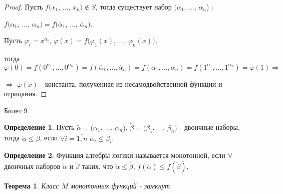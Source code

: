\documentclass[a4paper, 12pt]{article}
\renewcommand{\phi}{\varphi}
\theoremstyle{definition}
\newtheorem*{definition}{Определение}
\theoremstyle{plain}
\newtheorem*{theorem}{Теорема}
\theoremstyle{remark}
\begin{document}
  \begin{proof}
    Пусть $f(x_1$, $\ldots$, $x_n)\notin S$, тогда существует набор $(\alpha_1$, $\ldots$, $\alpha_n$) :\\ 
    \begin{center}
      $f(\alpha_1$, $\ldots$, $\alpha_n)=f(\overline{\alpha}_1$, $\ldots$, $\overline{\alpha}_n)$.\\
    \end{center} 
    Пусть $\phi_i=x^{\alpha_i}$, $\phi(x)=f(\phi_1(x)$, $\ldots$, $\phi_n(x))$,\\ 
    \begin{center}
      тогда $\phi(0)= f(0^{\alpha_1}, \ldots, 0^{\alpha_n})=f(\overline{\alpha}_1, \ldots, \overline{\alpha}_n)=f(\alpha_1, \ldots, \alpha_n)=f(1^{\alpha_1}, \ldots, 1^{\alpha_n})=\phi(1)\Longrightarrow$\\
    \end{center}
      $\Longrightarrow$ $\phi(x)$ - константа, полученная из несамодвойственной функции и отрицания.
  \end{proof}
  \begin{center}
    Билет 9
  \end{center}
  \begin{definition}
    Пусть $\tilde{\alpha}=(\alpha_1$, $\ldots$, $\alpha_n)$, $\tilde{\beta}=(\beta_1$, $\ldots$, $\beta_n)$ - двоичные наборы, тогда $\tilde{\alpha}\leqslant\tilde{\beta}$, если $\forall i=\overline{1,n}$ $\alpha_i\leqslant\beta_i$.
  \end{definition}
  \begin{definition}
    Функция алгебры логики называется монотонной, если $\forall$ двоичных наборов $\tilde{\alpha}$ и $\tilde{\beta}$ таких, что $\tilde{\alpha}\leqslant\tilde{\beta}$, $f(\tilde{\alpha})\leqslant f(\tilde{\beta})$.
  \end{definition}
  \begin{theorem}
    Класс $M$ монотонных функций - замкнут.
  \end{theorem}
\end{document}
